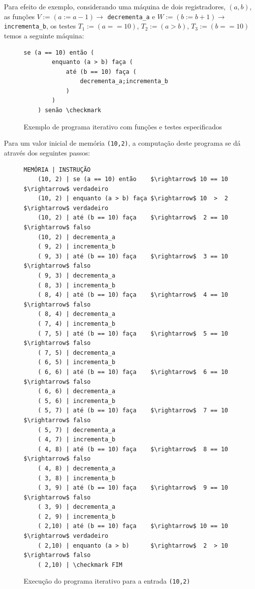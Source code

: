 \documentclass[12pt,fleqn]{article}
\begin{document}
Para efeito de exemplo, considerando uma máquina de dois registradores, $(a,b)$,
as funções $V := (a := a-1) \rightarrow$ \verb|decrementa_a| e $W := (b := b+1)
\rightarrow$ \verb|incrementa_b|, os testes $T_1 := (a == 10)$, $T_2 := (a >
b)$, $T_3 := (b == 10)$ temos a seguinte máquina:

\begin{figure}[H]
\begin{Verbatim}[commandchars=\\\{\},codes={\catcode`\$=3\catcode`\^=7}]
    se (a == 10) então (
        enquanto (a > b) faça (
            até (b == 10) faça (
                decrementa_a;incrementa_b
            )
        )
    ) senão \checkmark
\end{Verbatim}
\caption{Exemplo de programa iterativo com funções e testes especificados}
\end{figure}

\noindent
Para um valor inicial de memória \verb|(10,2)|, a computação deste programa se
dá através dos seguintes passos:

\begin{figure}[H]
\begin{Verbatim}[commandchars=\\\{\},codes={\catcode`\$=3\catcode`\^=7}]
    MEMÓRIA | INSTRUÇÃO
    (10, 2) | se (a == 10) então    $\rightarrow$ 10 == 10 $\rightarrow$ verdadeiro
    (10, 2) | enquanto (a > b) faça $\rightarrow$ 10  >  2 $\rightarrow$ verdadeiro
    (10, 2) | até (b == 10) faça    $\rightarrow$  2 == 10 $\rightarrow$ falso
    (10, 2) | decrementa_a
    ( 9, 2) | incrementa_b
    ( 9, 3) | até (b == 10) faça    $\rightarrow$  3 == 10 $\rightarrow$ falso
    ( 9, 3) | decrementa_a
    ( 8, 3) | incrementa_b
    ( 8, 4) | até (b == 10) faça    $\rightarrow$  4 == 10 $\rightarrow$ falso
    ( 8, 4) | decrementa_a
    ( 7, 4) | incrementa_b
    ( 7, 5) | até (b == 10) faça    $\rightarrow$  5 == 10 $\rightarrow$ falso
    ( 7, 5) | decrementa_a
    ( 6, 5) | incrementa_b
    ( 6, 6) | até (b == 10) faça    $\rightarrow$  6 == 10 $\rightarrow$ falso
    ( 6, 6) | decrementa_a
    ( 5, 6) | incrementa_b
    ( 5, 7) | até (b == 10) faça    $\rightarrow$  7 == 10 $\rightarrow$ falso
    ( 5, 7) | decrementa_a
    ( 4, 7) | incrementa_b
    ( 4, 8) | até (b == 10) faça    $\rightarrow$  8 == 10 $\rightarrow$ falso
    ( 4, 8) | decrementa_a
    ( 3, 8) | incrementa_b
    ( 3, 9) | até (b == 10) faça    $\rightarrow$  9 == 10 $\rightarrow$ falso
    ( 3, 9) | decrementa_a
    ( 2, 9) | incrementa_b
    ( 2,10) | até (b == 10) faça    $\rightarrow$ 10 == 10 $\rightarrow$ verdadeiro
    ( 2,10) | enquanto (a > b)      $\rightarrow$  2  > 10 $\rightarrow$ falso
    ( 2,10) | \checkmark FIM
\end{Verbatim}
\caption{Execução do programa iterativo para a entrada \texttt{(10,2)}}
\end{figure}
\end{document}
